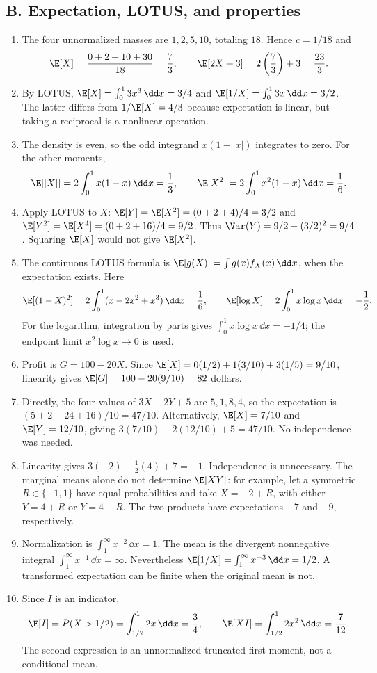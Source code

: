 \subsection{B. Expectation, LOTUS, and properties}
\begin{enumerate}[label=\textbf{B\arabic*.},leftmargin=*,itemsep=1em]
\item The four unnormalized masses are $1,2,5,10$, totaling $18$. Hence $c=1/18$ and
\[
\E[X]=\frac{0+2+10+30}{18}=\frac73,\qquad
\E[2X+3]=2\left(\frac73\right)+3=\frac{23}{3}.
\]
\item By LOTUS, $\E[X]=\int_0^13x^3\,\dd x=3/4$ and $\E[1/X]=\int_0^13x\,\dd x=3/2$. The latter differs from $1/\E[X]=4/3$ because expectation is linear, but taking a reciprocal is a nonlinear operation.
\item The density is even, so the odd integrand $x(1-|x|)$ integrates to zero. For the other moments,
\[
\E[|X|]=2\int_0^1x(1-x)\,\dd x=\frac13,\qquad
\E[X^2]=2\int_0^1x^2(1-x)\,\dd x=\frac16.
\]
\item Apply LOTUS to $X$: $\E[Y]=\E[X^2]=(0+2+4)/4=3/2$ and $\E[Y^2]=\E[X^4]=(0+2+16)/4=9/2$. Thus $\Var(Y)=9/2-(3/2)^2=9/4$. Squaring $\E[X]$ would not give $\E[X^2]$.
\item The continuous LOTUS formula is $\E[g(X)]=\int g(x)f_X(x)\,\dd x$, when the expectation exists. Here
\[
\E[(1-X)^2]=2\int_0^1(x-2x^2+x^3)\,\dd x=\frac16,
\qquad \E[\log X]=2\int_0^1x\log x\,\dd x=-\frac12.
\]
For the logarithm, integration by parts gives $\int_0^1x\log x\,\dd x=-1/4$; the endpoint limit $x^2\log x\to0$ is used.
\item Profit is $G=100-20X$. Since $\E[X]=0(1/2)+1(3/10)+3(1/5)=9/10$, linearity gives $\E[G]=100-20(9/10)=82$ dollars.
\item Directly, the four values of $3X-2Y+5$ are $5,1,8,4$, so the expectation is $(5+2+24+16)/10=47/10$. Alternatively, $\E[X]=7/10$ and $\E[Y]=12/10$, giving $3(7/10)-2(12/10)+5=47/10$. No independence was needed.
\item Linearity gives $3(-2)-\tfrac12(4)+7=-1$. Independence is unnecessary. The marginal means alone do not determine $\E[XY]$: for example, let a symmetric $R\in\{-1,1\}$ have equal probabilities and take $X=-2+R$, with either $Y=4+R$ or $Y=4-R$. The two products have expectations $-7$ and $-9$, respectively.
\item Normalization is $\int_1^\infty x^{-2}\,\dd x=1$. The mean is the divergent nonnegative integral $\int_1^\infty x^{-1}\,\dd x=\infty$. Nevertheless $\E[1/X]=\int_1^\infty x^{-3}\,\dd x=1/2$. A transformed expectation can be finite when the original mean is not.
\item Since $I$ is an indicator,
\[
\E[I]=P(X>1/2)=\int_{1/2}^12x\,\dd x=\frac34,\qquad
\E[XI]=\int_{1/2}^12x^2\,\dd x=\frac7{12}.
\]
The second expression is an unnormalized truncated first moment, not a conditional mean.
\end{enumerate}


